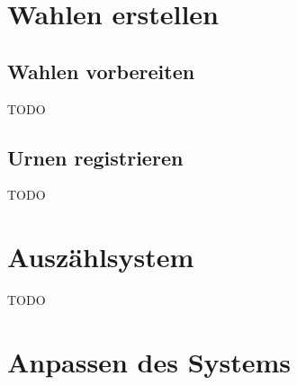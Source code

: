 \documentclass[a4paper,10pt]{article}
\begin{document}
\newpage
\section{Wahlen erstellen}
\subsection{Wahlen vorbereiten}
\begin{LARGE}TODO\end{LARGE}
\subsection{Urnen registrieren}
\begin{LARGE}TODO\end{LARGE}

\newpage
\section{Auszählsystem}
\begin{LARGE}TODO\end{LARGE}

\newpage
\section{Anpassen des Systems}
\end{document}

